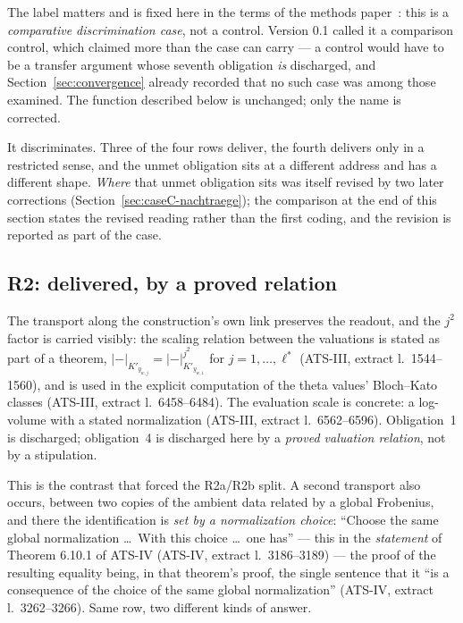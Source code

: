 \documentclass[11pt,a4paper]{article}
\theoremstyle{definition}
\newcommand{\anchor}[2]{(#1, extract l.~#2)}
\begin{document}
The label matters and is fixed here in the terms of the methods
paper~\cite{GeigerBCM2026}: this is a \emph{comparative discrimination case}, not
a control. Version 0.1 called it a comparison control, which claimed more than
the case can carry --- a control would have to be a transfer argument whose
seventh obligation \emph{is} discharged, and Section~\ref{sec:convergence}
already recorded that no such case was among those examined. The function
described below is unchanged; only the name is corrected.

It discriminates. Three of the four rows deliver, the fourth delivers only in a
restricted sense, and the unmet obligation sits at a different address and has a
different shape. \emph{Where} that unmet obligation sits was itself revised by two
later corrections (Section~\ref{sec:caseC-nachtraege}); the comparison at the end
of this section states the revised reading rather than the first coding, and the
revision is reported as part of the case.

\subsection{R2: delivered, by a proved relation}

The transport along the construction's own link preserves the readout, and the
$j^2$ factor is carried visibly: the scaling relation between the valuations is
stated as part of a theorem, $|-|_{K'_{y_{w,j}}} = |-|^{j^2}_{K'_{y_{w,1}}}$ for
$j = 1,\dots,\ell^*$ \anchor{ATS-III}{1544--1560}, and is used in the explicit
computation of the theta values' Bloch--Kato classes
\anchor{ATS-III}{6458--6484}. The evaluation scale is concrete: a log-volume with
a stated normalization \anchor{ATS-III}{6562--6596}. Obligation~1 is discharged;
obligation~4 is discharged here by a \emph{proved valuation relation}, not by a
stipulation.

This is the contrast that forced the R2a/R2b split. A second transport also
occurs, between two copies of the ambient data related by a global Frobenius, and
there the identification is \emph{set by a normalization choice}: ``Choose the
same global normalization \dots\ With this choice \dots\ one has''
--- this in the \emph{statement} of Theorem 6.10.1 of ATS-IV
\anchor{ATS-IV}{3186--3189} --- the proof of the resulting equality being, in that
theorem's proof, the single sentence that it ``is a consequence of the choice of
the same global normalization'' \anchor{ATS-IV}{3262--3266}. Same row, two
different kinds of answer.
\end{document}
